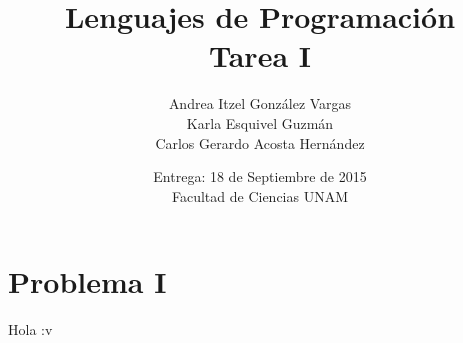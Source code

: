 \documentclass[12pt]{article}
\title{Lenguajes de Programación \\ Tarea I}
\author{Andrea Itzel González Vargas \\ Karla Esquivel Guzmán \\ Carlos Gerardo Acosta Hernández}
\date{Entrega: 18 de Septiembre de 2015 \\ Facultad de Ciencias UNAM}
\begin{document}
\maketitle
\section{Problema I}
Hola :v
\end{document}
